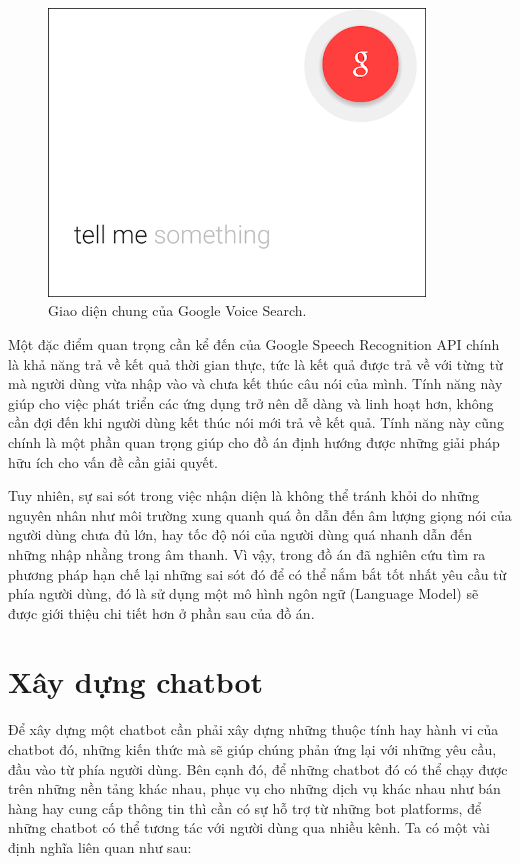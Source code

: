 \documentclass[12pt]{report}
\begin{document}
\begin{figure}[H]
  \centering
    \includegraphics[width=10cm]{Pics/Chap2/google-voice.png}
  \caption{Giao diện chung của Google Voice Search\cite{guiding-tech}.}
\end{figure}

Một đặc điểm quan trọng cần kể đến của Google Speech Recognition API chính là khả năng trả về kết quả thời gian thực, tức là kết quả được trả về với từng từ mà người dùng vừa nhập vào và chưa kết thúc câu nói của mình. Tính năng này giúp cho việc phát triển các ứng dụng trở nên dễ dàng và linh hoạt hơn, không cần đợi đến khi người dùng kết thúc nói mới trả về kết quả. Tính năng này cũng chính là một phần quan trọng giúp cho đồ án định hướng được những giải pháp hữu ích cho vấn đề cần giải quyết.

Tuy nhiên, sự sai sót trong việc nhận diện là không thể tránh khỏi do những nguyên nhân như môi trường xung quanh quá ồn dẫn đến âm lượng giọng nói của người dùng chưa đủ lớn, hay tốc độ nói của người dùng quá nhanh dẫn đến những nhập nhằng trong âm thanh. Vì vậy, trong đồ án đã nghiên cứu tìm ra phương pháp hạn chế lại những sai sót đó để có thể nắm bắt tốt nhất yêu cầu từ phía người dùng, đó là sử dụng một mô hình ngôn ngữ (Language Model) sẽ được giới thiệu chi tiết hơn ở phần sau của đồ án.

\section{Xây dựng chatbot}

Để xây dựng một chatbot cần phải xây dựng những thuộc tính hay hành vi của chatbot đó, những kiến thức mà sẽ giúp chúng phản ứng lại với những yêu cầu, đầu vào từ phía người dùng. Bên cạnh đó, để những chatbot đó có thể chạy được trên những nền tảng khác nhau, phục vụ cho những dịch vụ khác nhau như bán hàng hay cung cấp thông tin thì cần có sự hỗ trợ từ những bot platforms, để những chatbot có thể tương tác với người dùng qua nhiều kênh. Ta có một vài định nghĩa liên quan như sau:
\end{document}
